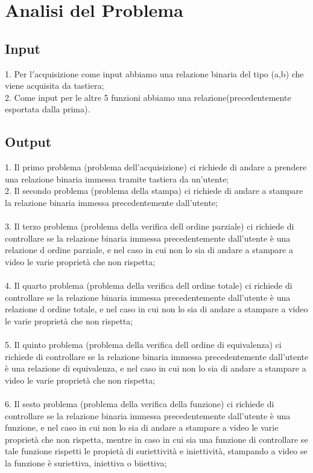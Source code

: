 \documentclass[11pt, a4paper, titlepage, block]{article}
\begin{document}
	\section{Analisi del Problema}
	\subsection{Input}
	
	
	1. Per l$'$acquisizione come input abbiamo una relazione binaria del tipo (a,b) che viene   acquisita da tastiera;\\
	2. Come input per le altre 5 funzioni abbiamo una relazione(precedentemente esportata dalla prima).\\
	\subsection{Output}
	
	
	1. Il primo problema (problema dell'acquisizione) ci richiede di andare a prendere una relazione binaria immessa tramite tastiera da un'utente;\\
	
	2. Il secondo problema (problema della stampa) ci richiede di andare a stampare la relazione binaria immessa precedentemente dall'utente;\\
	\\
	3. Il terzo problema (problema della verifica dell ordine parziale) ci richiede di controllare se la relazione binaria immessa precedentemente dall'utente è una relazione d ordine parziale, e nel caso in cui non lo sia di andare a stampare a video le varie propriet\`a che non rispetta;\\
	\\
	4. Il quarto problema (problema della verifica dell ordine totale) ci richiede di controllare se la relazione binaria immessa precedentemente dall'utente è una relazione d ordine totale, e nel caso in cui non lo sia di andare a stampare a video le varie propriet\`a che non rispetta;\\
	\\
	5. Il quinto problema (problema della verifica dell ordine di equivalenza) ci richiede di controllare se la relazione binaria immessa precedentemente dall'utente è una relazione di equivalenza, e nel caso in cui non lo sia di andare a stampare a video le varie propriet\`a che non rispetta;\\
	\\
	6. Il sesto problema (problema della verifica della funzione) ci richiede di controllare se la relazione binaria immessa precedentemente dall'utente è una funzione, e nel caso in cui non lo sia di andare a stampare a video le varie propriet\`a che non rispetta, mentre in caso in cui sia una funzione di controllare se tale funzione rispetti le propiet\`a di suriettivit\`a e iniettivit\`a, stampando a video se la funzione \`e suriettiva, iniettiva o biiettiva;\\
	
\end{document}
